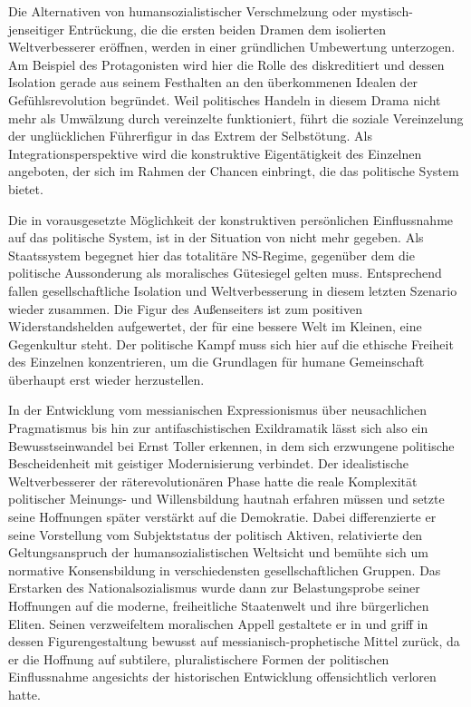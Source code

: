 Die Alternativen von humansozialistischer Verschmelzung oder
mystisch-jenseitiger Entrückung, die die ersten beiden Dramen dem isolierten
Weltverbesserer eröffnen, werden in  einer
gründlichen Umbewertung unterzogen. Am Beispiel des Protagonisten wird hier
die Rolle des  diskreditiert und dessen Isolation gerade aus
seinem Festhalten an den überkommenen Idealen der Gefühlsrevolution
begründet. Weil politisches Handeln in diesem Drama nicht mehr als
Umwälzung durch vereinzelte  funktioniert, führt die soziale
Vereinzelung der unglücklichen Führerfigur in das Extrem der Selbstötung. 
Als Integrationsperspektive wird die konstruktive Eigentätigkeit des Einzelnen
angeboten, der sich im Rahmen der Chancen einbringt, die das politische System
bietet.

Die in  vorausgesetzte Möglichkeit der konstruktiven
persönlichen Einflussnahme auf das politische System, ist in der Situation
von  nicht mehr gegeben. Als Staatssystem begegnet hier das
totalitäre NS-Regime, gegenüber dem die politische Aussonderung als moralisches
Gütesiegel gelten muss. Entsprechend fallen gesellschaftliche Isolation und
Weltverbesserung in diesem letzten Szenario wieder zusammen. Die Figur des
Außenseiters ist zum positiven Widerstandshelden aufgewertet, der für eine
bessere Welt im Kleinen, eine Gegenkultur steht. Der politische Kampf muss
sich hier auf die ethische Freiheit des Einzelnen konzentrieren, um 
die Grundlagen für humane Gemeinschaft überhaupt erst wieder herzustellen.

In der Entwicklung vom messianischen Expressionismus über neusachlichen
Pragmatismus bis hin zur antifaschistischen Exildramatik lässt sich also
ein  Bewusstseinwandel bei Ernst Toller erkennen, in dem sich erzwungene
politische Bescheidenheit mit geistiger Modernisierung verbindet. Der
idealistische Weltverbesserer der räterevolutionären Phase hatte die
reale Komplexität politischer Meinungs- und Willensbildung hautnah erfahren
müssen und setzte seine Hoffnungen später verstärkt auf die Demokratie. Dabei
differenzierte er seine Vorstellung vom Subjektstatus der politisch Aktiven,
relativierte den Geltungsanspruch der humansozialistischen Weltsicht und
bemühte sich um normative Konsensbildung in verschiedensten gesellschaftlichen
Gruppen. Das Erstarken des Nationalsozialismus wurde dann zur Belastungsprobe
seiner Hoffnungen auf die moderne, freiheitliche Staatenwelt und ihre
bürgerlichen Eliten. Seinen verzweifeltem moralischen Appell gestaltete er in 
 und griff in dessen Figurengestaltung bewusst auf
messianisch-prophetische Mittel zurück, da er die Hoffnung auf subtilere,
pluralistischere Formen der politischen Einflussnahme angesichts der historischen
Entwicklung offensichtlich verloren hatte.

